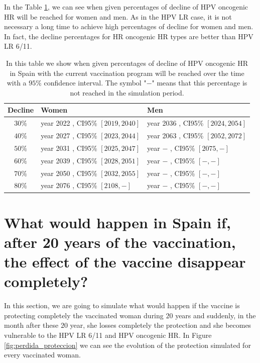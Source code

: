 In the Table \ref{tabla:oncoESP}, we can see when given percentages of decline of HPV oncogenic HR will be reached for women and men. As in the HPV LR case, it is not necessary a long time to achieve high percentages of decline for women and men. In fact, the decline percentages for HR oncogenic HR types are better than HPV LR 6/11.

\begin{table}[!h]
	\centering
	\begin{tabular}{c|ll}
		Decline & Women & Men \\ 
		\hline 
$ 30 \%$ & year  2022 , CI95\% $[ 2019 , 2040 ]$ & year  2036 , CI95\% $[ 2024 , 2054 ]$  \\
$ 40 \%$ & year  2027 , CI95\% $[ 2023 , 2044 ]$ & year  2063 , CI95\% $[ 2052 , 2072 ]$  \\
$ 50 \%$ & year  2031 , CI95\% $[ 2025 , 2047 ]$ & year  $-$ , CI95\% $[ 2075 , - ]$  \\
$ 60 \%$ & year  2039 , CI95\% $[ 2028 , 2051 ]$ & year  $-$ , CI95\% $[ - , - ]$  \\
$ 70 \%$ & year  2050 , CI95\% $[ 2032 , 2055 ]$ & year  $-$ , CI95\% $[ - , - ]$  \\
$ 80 \%$ & year  2076 , CI95\% $[ 2108 , - ]$ & year  $-$ , CI95\% $[ - , - ]$  \\
    \end{tabular} 
	\caption{In this table we show when given percentages of decline of HPV oncogenic HR in Spain with the current vaccination program will be reached over the time with a $95\%$ confidence interval. The symbol "$-$" means that this percentage is not reached in the simulation period. }
	\label{tabla:oncoESP}
\end{table}

\section{What would happen in Spain if, after 20 years of the vaccination, the effect of the vaccine disappear completely?}
In this section, we are going to simulate what would happen if the vaccine is protecting completely the vaccinated woman during $20$ years and suddenly, in the month after these $20$ year, she losses completely the protection and she becomes vulnerable to the HPV LR 6/11 and HPV oncogenic HR. In Figure \ref{fig:perdida_proteccion} we can see the evolution of the protection simulated for every vaccinated woman.

